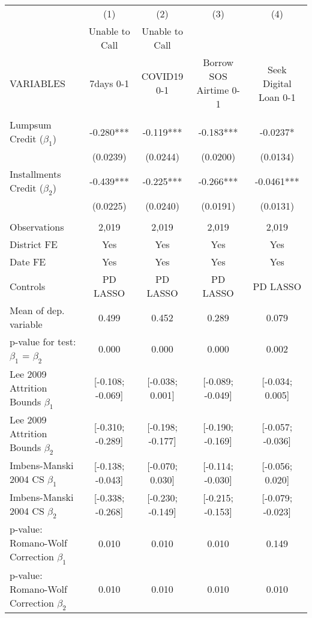 \begin{tabular}{lcccc} \hline
 & (1) & (2) & (3) & (4) \\
 & Unable to Call & Unable to Call &  &  \\
VARIABLES & 7days 0-1 & COVID19 0-1 & Borrow SOS Airtime 0-1 & Seek Digital Loan 0-1 \\ \hline
 &  &  &  &  \\
Lumpsum Credit ($\beta_1$) & -0.280*** & -0.119*** & -0.183*** & -0.0237* \\
 & (0.0239) & (0.0244) & (0.0200) & (0.0134) \\
Installments Credit ($\beta_2$) & -0.439*** & -0.225*** & -0.266*** & -0.0461*** \\
 & (0.0225) & (0.0240) & (0.0191) & (0.0131) \\
 &  &  &  &  \\
Observations & 2,019 & 2,019 & 2,019 & 2,019 \\
District FE & Yes & Yes & Yes & Yes \\
Date FE & Yes & Yes & Yes & Yes \\
Controls & PD LASSO & PD LASSO & PD LASSO & PD LASSO \\
Mean of dep. variable & 0.499 & 0.452 & 0.289 & 0.079 \\
p-value for test: $\beta_1$ = $\beta_2$ & 0.000 & 0.000 & 0.000 & 0.002 \\
Lee 2009 Attrition Bounds $\beta_1$ & [-0.108; -0.069] & [-0.038; 0.001] & [-0.089; -0.049] & [-0.034; 0.005] \\
Lee 2009 Attrition Bounds $\beta_2$ & [-0.310; -0.289] & [-0.198; -0.177] & [-0.190; -0.169] & [-0.057; -0.036] \\
Imbens-Manski 2004 CS $\beta_1$ & [-0.138; -0.043] & [-0.070; 0.030] & [-0.114; -0.030] & [-0.056; 0.020] \\
Imbens-Manski 2004 CS $\beta_2$ & [-0.338; -0.268] & [-0.230; -0.149] & [-0.215; -0.153] & [-0.079; -0.023] \\
p-value: Romano-Wolf Correction $\beta_1$ & 0.010 & 0.010 & 0.010 & 0.149 \\
 p-value: Romano-Wolf Correction $\beta_2$ & 0.010 & 0.010 & 0.010 & 0.010 \\ \hline
\end{tabular}
